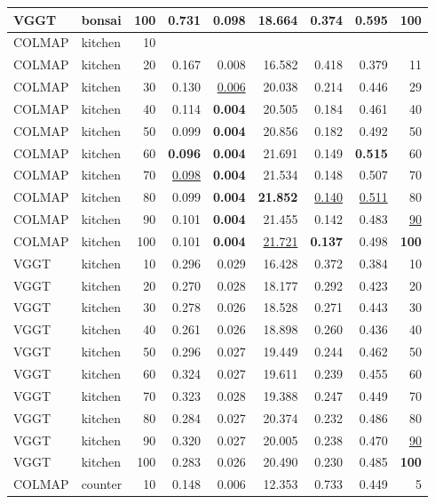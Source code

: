 \begin{table}[H]
\begin{tabular}{llrrrrrrr}
VGGT & bonsai & 100 & 0.731 & 0.098 & 18.664 & 0.374 & 0.595 & \textbf{100} \\
\midrule
COLMAP & kitchen & 10 &  &  &  &  &  &  \\
COLMAP & kitchen & 20 & 0.167 & 0.008 & 16.582 & 0.418 & 0.379 & 11 \\
COLMAP & kitchen & 30 & 0.130 & \underline{0.006} & 20.038 & 0.214 & 0.446 & 29 \\
COLMAP & kitchen & 40 & 0.114 & \textbf{0.004} & 20.505 & 0.184 & 0.461 & 40 \\
COLMAP & kitchen & 50 & 0.099 & \textbf{0.004} & 20.856 & 0.182 & 0.492 & 50 \\
COLMAP & kitchen & 60 & \textbf{0.096} & \textbf{0.004} & 21.691 & 0.149 & \textbf{0.515} & 60 \\
COLMAP & kitchen & 70 & \underline{0.098} & \textbf{0.004} & 21.534 & 0.148 & 0.507 & 70 \\
COLMAP & kitchen & 80 & 0.099 & \textbf{0.004} & \textbf{21.852} & \underline{0.140} & \underline{0.511} & 80 \\
COLMAP & kitchen & 90 & 0.101 & \textbf{0.004} & 21.455 & 0.142 & 0.483 & \underline{90} \\
COLMAP & kitchen & 100 & 0.101 & \textbf{0.004} & \underline{21.721} & \textbf{0.137} & 0.498 & \textbf{100} \\
VGGT & kitchen & 10 & 0.296 & 0.029 & 16.428 & 0.372 & 0.384 & 10 \\
VGGT & kitchen & 20 & 0.270 & 0.028 & 18.177 & 0.292 & 0.423 & 20 \\
VGGT & kitchen & 30 & 0.278 & 0.026 & 18.528 & 0.271 & 0.443 & 30 \\
VGGT & kitchen & 40 & 0.261 & 0.026 & 18.898 & 0.260 & 0.436 & 40 \\
VGGT & kitchen & 50 & 0.296 & 0.027 & 19.449 & 0.244 & 0.462 & 50 \\
VGGT & kitchen & 60 & 0.324 & 0.027 & 19.611 & 0.239 & 0.455 & 60 \\
VGGT & kitchen & 70 & 0.323 & 0.028 & 19.388 & 0.247 & 0.449 & 70 \\
VGGT & kitchen & 80 & 0.284 & 0.027 & 20.374 & 0.232 & 0.486 & 80 \\
VGGT & kitchen & 90 & 0.320 & 0.027 & 20.005 & 0.238 & 0.470 & \underline{90} \\
VGGT & kitchen & 100 & 0.283 & 0.026 & 20.490 & 0.230 & 0.485 & \textbf{100} \\
\midrule
COLMAP & counter & 10 & 0.148 & 0.006 & 12.353 & 0.733 & 0.449 & 5 \\

\end{tabular}
\end{table}
